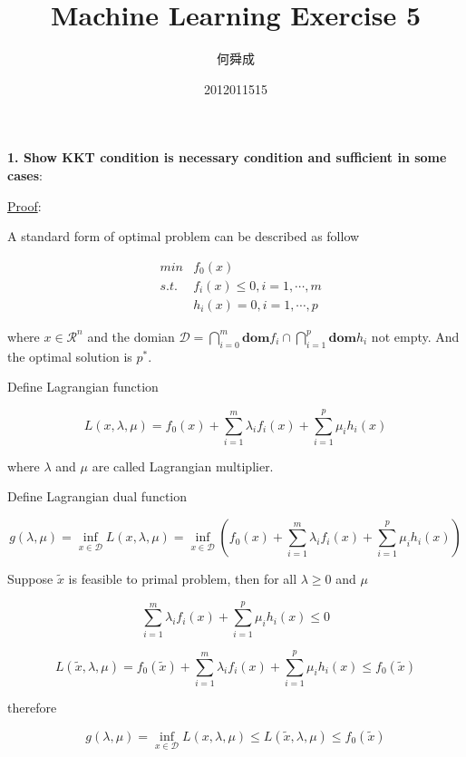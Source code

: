 \documentclass[UTF8]{ctexart}
\author{何舜成}
\date{2012011515}
\title{Machine Learning Exercise 5}
\begin{document}
\maketitle
\textbf{1. Show KKT condition is necessary condition and sufficient in some cases}:\par
\uline{Proof}:\par
A standard form of optimal problem can be described as follow\par
\begin{eqnarray*}
 &min&f_{0}(x)\\
&s.t.&f_{i}(x)\leq 0,i=1,\cdots,m\\
& &h_{i}(x)=0,i=1,\cdots,p
\end{eqnarray*}\par
where $x\in\mathcal{R}^{n}$ and the domian $\mathcal{D}=\bigcap_{i=0}^{m}\textbf{dom}f_{i}\cap\bigcap_{i=1}^{p}\textbf{dom}h_{i}$ not empty. And the optimal solution is $p^{*}$.\par
Define Lagrangian function\par
\begin{equation*}
L(x,\lambda,\mu)=f_{0}(x)+\sum_{i=1}^{m}\lambda_{i}f_{i}(x)+\sum_{i=1}^{p}\mu_{i}h_{i}(x)
\end{equation*}\par
where $\lambda$ and $\mu$ are called Lagrangian multiplier.\par
Define Lagrangian dual function\par
\begin{equation*}
g(\lambda,\mu)=\inf_{x\in\mathcal{D}}L(x,\lambda,\mu)=\inf_{x\in\mathcal{D}}(f_{0}(x)+\sum_{i=1}^{m}\lambda_{i}f_{i}(x)+\sum_{i=1}^{p}\mu_{i}h_{i}(x))
\end{equation*}\par
Suppose $\tilde{x}$ is feasible to primal problem, then for all $\lambda\geq 0$ and $\mu$\par
\begin{equation*}
\sum_{i=1}^{m}\lambda_{i}f_{i}(x)+\sum_{i=1}^{p}\mu_{i}h_{i}(x)\leq 0
\end{equation*}\par
\begin{equation*}
L(\tilde{x},\lambda,\mu)=f_{0}(\tilde{x})+\sum_{i=1}^{m}\lambda_{i}f_{i}(x)+\sum_{i=1}^{p}\mu_{i}h_{i}(x)\leq f_{0}(\tilde{x})
\end{equation*}\par
therefore\par
\begin{equation*}
g(\lambda,\mu)=\inf_{x\in\mathcal{D}}L(x,\lambda,\mu)\leq L(\tilde{x},\lambda,\mu)\leq f_{0}(\tilde{x})
\end{equation*}\par
\end{document}
